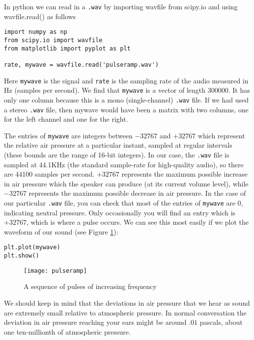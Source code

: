 In python we can read in a \texttt{.wav} by importing wavfile from scipy.io and using wavfile.read() as follows
\begin{lstlisting}
import numpy as np
from scipy.io import wavfile
from matplotlib import pyplot as plt 

rate, mywave = wavfile.read('pulseramp.wav')
\end{lstlisting}
Here \texttt{mywave} is the signal and \texttt{rate} is the sampling rate of the audio measured in Hz (samples per second). 
% 
We find that \texttt{mywave} is a vector of length $300000$. It has only one column because this is a mono (single-channel) \texttt{.wav} file. 
If we had used a stereo \texttt{.wav} file, then mywave would have been a matrix with two columns, one for the left channel and one for the right.

The entries of \texttt{mywave} are integers between $-32767$ and $+32767$ which represent the relative air pressure at a particular instant, sampled at regular intervals (these bounds are the range of 16-bit integers).   
In our case, the \texttt{.wav} file is sampled at 44.1KHz (the standard sample-rate for high-quality audio), so there are 44100 samples per second. 
$+32767$ represents the maximum possible increase in air pressure which the speaker can produce (at its current volume level), while $-32767$ represents the maximum possible decrease in air pressure. 
In the case of our particular \texttt{.wav} file, you can check that most of the entries of \texttt{mywave} are $0$, indicating neutral pressure. 
Only occasionally you will find an entry which is $+32767$, which is where a pulse occurs.
We can see this most easily if we plot the waveform of our sound (see Figure \ref{pulseramp}):
\begin{lstlisting}
plt.plot(mywave)
plt.show()
\end{lstlisting}
\begin{figure}[ht]\caption{A sequence of pulses of increasing frequency}\label{pulseramp}\centering\texttt{[image: pulseramp]}\end{figure}

We should keep in mind that the deviations in air pressure that we hear as sound are extremely small relative to atmospheric pressure. 
In normal conversation the deviation in air pressure reaching your ears might be around $.01$ pascals, about one ten-millionth of atmospheric pressure.


